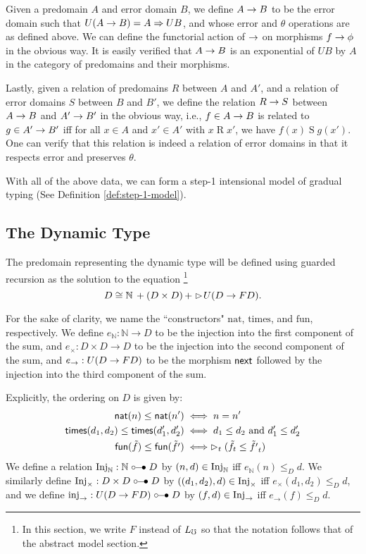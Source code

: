 Given a predomain $A$ and error domain $B$, we define
$A \to B$ to be the error domain such that $U(A \to B) = A \Rightarrow UB$,
and whose error and $\theta$ operations are as defined above.
We can define the functorial action of $\to$ on morphisms
$f \to \phi$ in the obvious way.
%
It is easily verified that $A \to B$ is an exponential of $UB$ by $A$
in the category of predomains and their morphisms.

Lastly, given a relation of predomains $R$ between $A$ and $A'$, and a relation
of error domains $S$ between $B$ and $B'$, we define the relation $R \to S$
between $A \to B$ and $A' \to B'$ in the obvious way, i.e., $f \in A \to B$
is related to $g \in A' \to B'$ iff for all $x \in A$ and $x' \in A'$ with
$x \mathrel{R} x'$, we have $f(x) \mathrel{S} g(x')$.
%
One can verify that this relation is indeed a relation of error domains
in that it respects error and preserves $\theta$.

With all of the above data, we can form a step-1 intensional model of gradual typing
(See Definition \ref{def:step-1-model}).

\subsection{The Dynamic Type}
The predomain representing the dynamic type will be defined using guarded recursion
as the solution to the equation
\footnote{In this section, we write $F$ instead of $L_\mho$ so that the notation follows that of the abstract model section.}
%
\[ D \cong \mathbb{N}\, + (D \times D)\, + \vartriangleright \hspace{-0.2em} U(D \to FD). \]
%

For the sake of clarity, we name the ``constructors" $\text{nat}$, $\text{times}$,
and $\text{fun}$, respectively.
%
We define $e_\mathbb{N} : \mathbb{N} \to D$ to be the injection into the first
component of the sum, and $e_\times : D \times D \to D$ to be the injection into
the second component of the sum, and $e_\to : U(D \to F D)$ to be the morphism
$\mathsf{next}$ followed by the injection into the third component of the sum.

Explicitly, the ordering on $D$ is given by:
%
\begin{align*}
    \mathsf{nat}(n) \le \mathsf{nat}(n') 
        &\iff n = n' \\
    \mathsf{times} (d_1, d_2) \le \mathsf{times} (d_1', d_2')
        &\iff d_1 \le d_2 \text{ and } d_1' \le d_2'\\
    \mathsf{fun}(\tilde{f}) \le \mathsf{fun}(\tilde{f'}) 
        &\iff \vartriangleright_t(\tilde{f}_t \le \tilde{f'}_t)
\end{align*}
%
We define a relation $\text{Inj}_\mathbb{N} : \mathbb{N} \mathrel{\circ\mkern-6mu-\mkern-6mu\bullet} D$ by
$(n, d) \in \text{Inj}_\mathbb{N}$ iff $e_\mathbb{N}(n) \le_D d$.
We similarly define $\text{Inj}_\times : D \times D \mathrel{\circ\mkern-6mu-\mkern-6mu\bullet} D$ by
$((d_1, d_2), d) \in \text{Inj}_\times$ iff $e_\times(d_1, d_2) \le_D d$,
and we define $\text{inj}_\to : U(D \to F D) \mathrel{\circ\mkern-6mu-\mkern-6mu\bullet} D$ by
$(f, d) \in \text{Inj}_\to$ iff $e_\to(f) \le_D d$.

